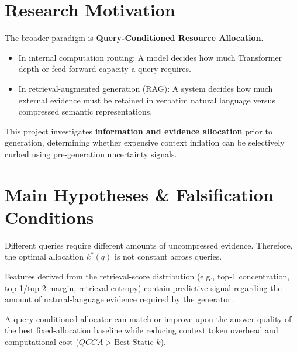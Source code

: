 \documentclass[11pt,a4paper]{article}
\begin{document}
\section{Research Motivation}
The broader paradigm is \textbf{Query-Conditioned Resource Allocation}.
\begin{itemize}
    \item In internal computation routing: A model decides how much Transformer depth or feed-forward capacity a query requires.
    \item In retrieval-augmented generation (RAG): A system decides how much external evidence must be retained in verbatim natural language versus compressed semantic representations.
\end{itemize}
This project investigates \textbf{information and evidence allocation} prior to generation, determining whether expensive context inflation can be selectively curbed using pre-generation uncertainty signals.

\section{Main Hypotheses \& Falsification Conditions}

\begin{hypothesisbox}
Different queries require different amounts of uncompressed evidence. Therefore, the optimal allocation $k^*(q)$ is not constant across queries.
\end{hypothesisbox}

\begin{hypothesisbox}
Features derived from the retrieval-score distribution (e.g., top-1 concentration, top-1/top-2 margin, retrieval entropy) contain predictive signal regarding the amount of natural-language evidence required by the generator.
\end{hypothesisbox}

\begin{hypothesisbox}
A query-conditioned allocator can match or improve upon the answer quality of the best fixed-allocation baseline while reducing context token overhead and computational cost ($QCCA > \text{Best Static } k$).
\end{hypothesisbox}
\end{document}

